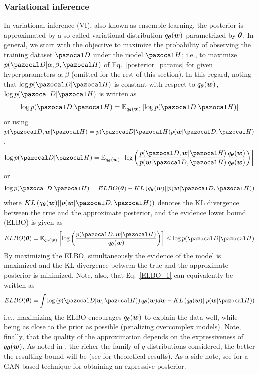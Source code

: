 \subsubsection{Variational inference}\label{sec:vi}
In variational inference (VI), also known as ensemble learning, the posterior is approximated by a so-called variational distribution $q_{\boldsymbol{\theta}}(\boldsymbol{w})$ parametrized by $\boldsymbol{\theta}$.
In general, we start with the objective to maximize the probability of observing the training dataset $\cD$ under the model $\cH$; i.e., to maximize $p(\cD|\alpha,\beta,\cH)$ of Eq.~\eqref{posterior_params} for given hyperparameters $\alpha,\beta$ (omitted for the rest of this section).
In this regard, noting that $\log p(\cD|\cH)$ is constant with respect to $q_{\boldsymbol{\theta}}(\boldsymbol{w})$, $\log p(\cD|\cH)$ is written as 
\begin{equation}
	\log p(\cD|\cH) = \mathbb{E}_{q_{\bth}(\bw)}\left[\log p(\cD|\cH) \right]
\end{equation}
or using $p(\cD,\bw|\cH) = p(\cD|\cH)p(\bw|\cD,\cH)$,
\begin{equation}
\log p(\cD|\cH) = \mathbb{E}_{q_{\bth}(\bw)}\left[\log \left(\frac{p(\cD,\bw|\cH)}{p(\bw|\cD, \cH)}\frac{q_{\bth}(\bw)}{q_{\bth}(\bw)}\right) \right]
\end{equation}
or 
\begin{equation}
\log p(\cD|\cH) = ELBO(\bth)  + KL\left(q_{\bth}(\bw)||p(\bw|\cD, \cH)\right)
\end{equation}
where $KL\left(q_{\bth}(\bw)||p(\bw|\cD, \cH)\right)$ denotes the KL divergence between the true and the approximate posterior, and the evidence lower bound (ELBO) is given as
\begin{equation}\label{ELBO_1}
ELBO(\bth) = \mathbb{E}_{q_{\bth}(\bw)}\left[\log \left(\frac{p(\cD,\bw|\cH)}{q_{\bth}(\bw)}\right) \right] \leq \log p(\cD|\cH)
\end{equation}
By maximizing the ELBO, simultaneously the evidence of the model is maximized and the KL divergence between the true and the approximate posterior is minimized. 
Note, also, that Eq.~\eqref{ELBO_1} can equivalently be written as
\begin{equation}\label{ELBO_2}
ELBO(\bth) = \int \log\left(p(\cD|\bw,\cH)\right)q_{\bth}(\bw) d\bw - KL\left(q_{\bth}(\bw)||p(\bw|\cH)\right)
\end{equation}
i.e., maximizing the ELBO encourages $q_{\boldsymbol{\theta}}(\boldsymbol{w})$ to explain the data well, while being as close to the prior as possible (penalizing overcomplex models).
Note, finally, that the quality of the approximation depends on the expressiveness of $q_{\boldsymbol{\theta}}(\boldsymbol{w})$.
As noted in \textcite{barber1998ensemble}, the richer the family of $q$ distributions considered, the better the resulting bound will be (see \cite{foong2019expressiveness} for theoretical results).
As a side note, see \textcite{mescheder2018adversarial} for a GAN-based technique for obtaining an expressive posterior.

